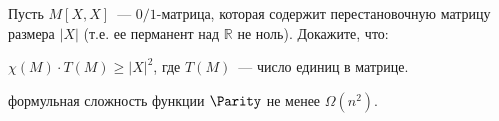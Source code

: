 Пусть $M[X, X]$~--- $0 / 1$-матрица, которая содержит перестановочную матрицу размера $|X|$ (т.е. ее
перманент над $\mathbb{R}$ не ноль). Докажите, что:
\begin{enumcyr}
    \item $\chi(M) \cdot T(M) \ge |X|^2$, где $T(M)$~--- число единиц в матрице.
    \item формульная сложность функции $\Parity$ не менее $\Omega(n^2)$.
\end{enumcyr}